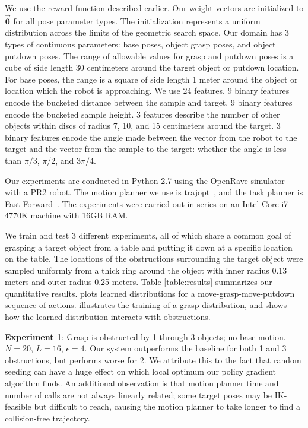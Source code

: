 We use the reward function described earlier. Our weight
vectors are initialized to $\vec{\mathbf{0}}$ for all pose parameter types.
The initialization represents a uniform distribution across the limits of the geometric search space.
Our domain has 3 types of continuous parameters: base poses, object grasp poses, and object putdown poses.
The range of allowable values for grasp and putdown poses is a cube of side length 30 centimeters
around the target object or putdown location. For base poses, the range is a
square of side length 1 meter around the object or location which the robot is approaching.
We use 24 features. 9 binary features encode the bucketed distance between the sample
and target. 9 binary features encode the bucketed sample height. 3 features
describe the number of other objects within discs of radius 7, 10, and 15 centimeters around the
target. 3 binary features encode the angle made between the vector from the
robot to the target and the vector from the sample to the target: whether the angle is less than
$\pi/3$, $\pi/2$, and $3\pi/4$.

Our experiments are conducted in Python 2.7 using the OpenRave simulator~\cite{Diankov_2008_6117} with a PR2 robot.
The motion planner we use is trajopt~\cite{schulman2013finding}, and the task planner is Fast-Forward~\cite{FF}.
The experiments were carried out in series on an Intel Core i7-4770K machine
with 16GB RAM.

We train and test 3 different experiments, all of which share a common goal of
grasping a target object from a table and putting it down at a specific location on the table.
The locations of the obstructions surrounding the target object were
sampled uniformly from a thick ring around the object with inner radius 0.13 meters
and outer radius 0.25 meters. Table \ref{table:results} summarizes our quantitative results.
 plots learned distributions for a move-grasp-move-putdown sequence of actions.
 illustrates the training of a grasp distribution, and 
shows how the learned distribution interacts with obstructions.

\textbf{Experiment 1}: Grasp is obstructed by 1 through 3 objects; no base motion.
$N = 20$, $L = 16$, $\epsilon = 4$. Our system outperforms the baseline for both 1 and 3
obstructions, but performs worse for 2. We attribute this to the fact that random seeding can
have a huge effect on which local optimum our policy gradient algorithm finds. An additional
observation is that motion planner time and number of calls are not always linearly related; some target
poses may be IK-feasible but difficult to reach, causing the motion planner to take longer
to find a collision-free trajectory.


